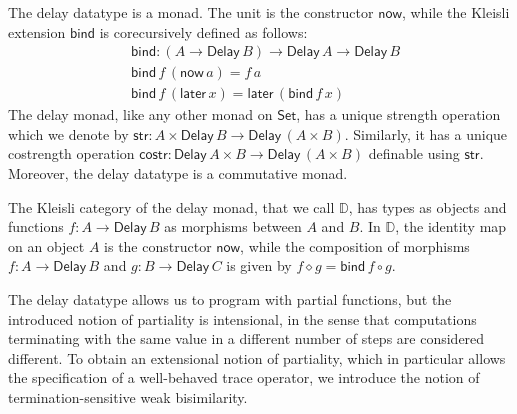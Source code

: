 \documentclass[runningheads]{llncs}
\newcommand{\Set}{\mathsf{Set}}
\newcommand{\comp}{\circ}
\newcommand{\Delay}{\mathsf{Delay}\,}
\newcommand{\now}{\mathsf{now}}
\newcommand{\later}{\mathsf{later}}
\newcommand{\bind}{\mathsf{bind}}
\newcommand{\str}{\mathsf{str}}
\newcommand{\costr}{\mathsf{costr}}
\newcommand{\D}{\mathbb{D}}
\begin{document}
The delay datatype is a monad. The unit is the constructor $\now$,
while the Kleisli extension $\bind$ is corecursively defined as follows:
\begin{align*}
& \bind : (A \to \Delay B) \to \Delay A \to \Delay B \\
& \bind \,f \, (\now\,a) = f\,a \\
& \bind\,f\,(\later\,x) = \later\,(\bind\,f\,x)
\end{align*}
The delay monad, like any other monad on $\Set$, has a unique strength
operation which we denote by $\str : A \times \Delay B \to \Delay (A
\times B)$. Similarly, it has a unique costrength operation $\costr :
\Delay A \times B \to \Delay (A \times B)$ definable using $\str$. Moreover, the delay datatype is a commutative monad.

The Kleisli category of the delay monad, that we call $\D$, has types
as objects and functions $f : A \to \Delay B$ as morphisms between $A$
and $B$. In $\D$, the identity map on an object $A$ is the constructor
$\now$, while the composition of morphisms $f : A \to \Delay B$ and $g
: B \to \Delay C$ is given by $f \diamond g = \bind\,f \comp g$.

The delay datatype allows us to program with partial functions, but
the introduced notion of partiality is intensional, in the sense that
computations terminating with the same value in a different number of
steps are considered different. To obtain an extensional notion of
partiality, which in particular allows the specification of a
well-behaved trace operator, we introduce the notion of termination-sensitive
weak bisimilarity.
\end{document}
